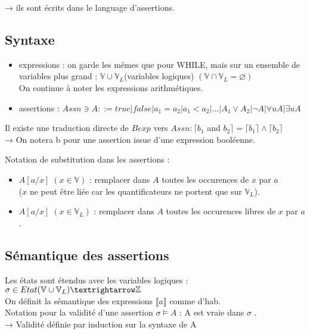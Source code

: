 \documentclass[10pt,a4paper]{article}
\newcommand{\sem}[1]{$\llbracket #1 \rrbracket$}
\newcommand{\Vs}{\mathbb{V}}
\begin{document}
\quad→ ils sont écrits dans le language d'assertions.

\subsection{Syntaxe}
\begin{itemize}
 \item expressions : on garde les mêmes que pour WHILE, mais sur un ensemble de variables plus grand : $\Vs \cup \Vs_L $(variables logiques) $(\Vs \cap \Vs_L = \varnothing)$\\
On continue à noter les expressions arithmétiques.
\item assertions : $Assn \ni A ::= true | false | a_1 = a_2 | a_1 < a_2 | \dots | A_1 \vee A_2 | \lnot A | \forall u A | \exists u A$
\end{itemize}
\begin{rem}
 Il existe une traduction directe de $Bexp$ vers $Assn : \lceil b_1$ and $b_2 \rceil =  \lceil b_1 \rceil \wedge \lceil b_2 \rceil$ \\
→ On notera b pour une assertion issue d'une expression booléenne.
\end{rem}
Notation de substitution dans les assertions :
\begin{itemize}
 \item $A[a/x]\; (x \in \Vs)$ : remplacer dans $A$ toutes les occurences de $x$ par $a$\\
 ($x$ ne peut être liée car les quantificateurs ne portent que sur $\Vs_L$).
 \item $A[a/x] \;(x \in \Vs_L)$ : remplacer dans $A$ toutes les occurences libres de $x$ par $a$.
\end{itemize}


\subsection{Sémantique des assertions}
Les états sont étendus avec les variables logiques :
$\sigma \in Etat (\Vs \cup \Vs_L) → \Zs$\\

On définit la sémantique des expressions \sem{a} comme d'hab.\\
Notation pour la validité d'une assertion $\sigma \models A$ : \og A est vraie dans $\sigma$ \fg.\\
→ Validité définie par induction sur la syntaxe de A
\end{document}
